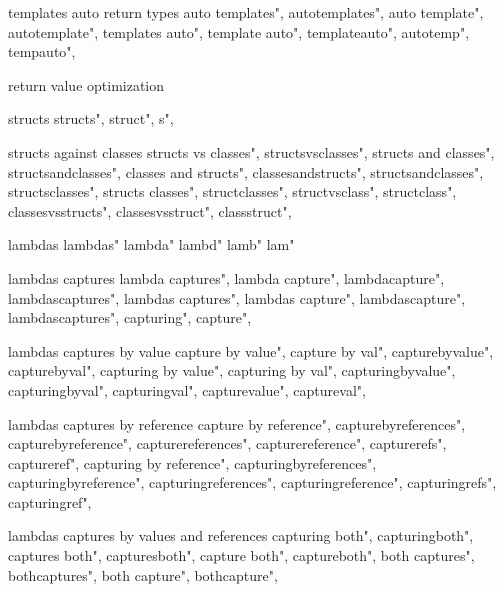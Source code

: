          templates auto return types 
        auto templates",  
        autotemplates",  
        auto template",  
        autotemplate",  
        templates auto",  
        template auto",  
        templateauto",  
        autotemp",  
        tempauto",  
        
         return value optimization 
        
         structs 
        structs",
        struct",
        s",
        
         structs against classes 
        structs vs classes",  
        structsvsclasses",  
        structs and classes",  
        structsandclasses",  
        classes and structs",  
        classesandstructs",  
        structsandclasses",  
        structsclasses",  
        structs classes",  
        structclasses",  
        structvsclass",  
        structclass",  
        classesvsstructs",  
        classesvsstruct",  
        classstruct",  
        
         lambdas
        lambdas"
        lambda"
        lambd"
        lamb"
        lam"
        
         lambdas captures
        lambda captures",  
        lambda capture",  
        lambdacapture",  
        lambdascaptures",  
        lambdas captures",  
        lambdas capture",  
        lambdascapture",  
        lambdascaptures",  
        capturing",  
        capture",  
        
         lambdas captures by value
        capture by value",  
        capture by val",  
        capturebyvalue",  
        capturebyval",  
        capturing by value",  
        capturing by val",  
        capturingbyvalue",  
        capturingbyval",  
        capturingval",  
        capturevalue",  
        captureval",  
        
         lambdas captures by reference 
        capture by reference",  
        capturebyreferences",  
        capturebyreference",  
        capturereferences",  
        capturereference",  
        capturerefs",  
        captureref",  
        capturing by reference",  
        capturingbyreferences",  
        capturingbyreference",  
        capturingreferences",  
        capturingreference",  
        capturingrefs",  
        capturingref",  
        
         lambdas captures by values and references 
        capturing both",  
        capturingboth",  
        captures both",  
        capturesboth",  
        capture both",  
        captureboth",  
        both captures",  
        bothcaptures",  
        both capture",  
        bothcapture",  
        
